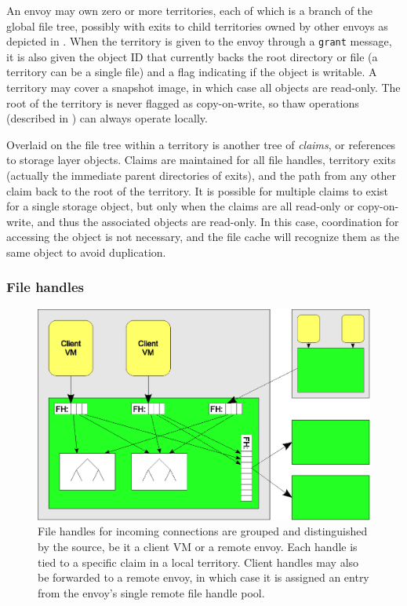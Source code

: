 An envoy may own zero or more territories, each of which is a branch of the global file tree, possibly with exits to child territories owned by other envoys as depicted in . When the territory is given to the envoy through a \texttt{grant} message, it is also given the object ID that currently backs the root directory or file (a territory can be a single file) and a flag indicating if the object is writable. A territory may cover a snapshot image, in which case all objects are read-only. The root of the territory is never flagged as copy-on-write, so thaw operations (described in ) can always operate locally.

Overlaid on the file tree within a territory is another tree of \emph{claims}, or references to storage layer objects. Claims are maintained for all file handles, territory exits (actually the immediate parent directories of exits), and the path from any other claim back to the root of the territory. It is possible for multiple claims to exist for a single storage object, but only when the claims are all read-only or copy-on-write, and thus the associated objects are read-only. In this case, coordination for accessing the object is not necessary, and the file cache will recognize them as the same object to avoid duplication.

\subsubsection{File handles}

\begin{figure}[tp]
\centering
\includegraphics[width=.8\textwidth]{figures/file-handles}
\caption[Managing file handles in local and remote envoys]{File handles for incoming connections are grouped and distinguished by the source, be it a client VM or a remote envoy. Each handle is tied to a specific claim in a local territory. Client handles may also be forwarded to a remote envoy, in which case it is assigned an entry from the envoy's single remote file handle pool.}
\label{fig:file-handles}
\end{figure}

